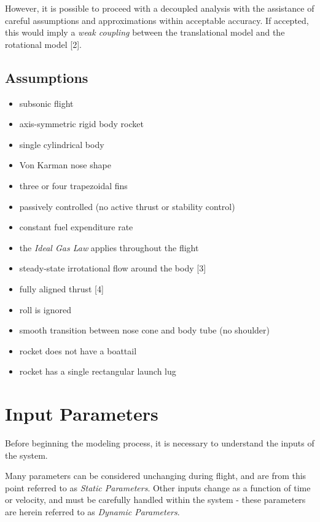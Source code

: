 \documentclass[]{article}
\providecommand{\tightlist}{%
  \setlength{\itemsep}{0pt}\setlength{\parskip}{0pt}}
\begin{document}
However, it is possible to proceed with a decoupled analysis with the
assistance of careful assumptions and approximations within acceptable
accuracy. If accepted, this would imply a \emph{weak coupling} between
the translational model and the rotational model {[}2{]}.

\subsection{Assumptions}\label{assumptions}

\begin{itemize}
\tightlist
\item
  subsonic flight
\item
  axis-symmetric rigid body rocket
\item
  single cylindrical body
\item
  Von Karman nose shape
\item
  three or four trapezoidal fins
\item
  passively controlled (no active thrust or stability control)
\item
  constant fuel expenditure rate
\item
  the \emph{Ideal Gas Law} applies throughout the flight
\item
  steady-state irrotational flow around the body {[}3{]}
\item
  fully aligned thrust {[}4{]}
\item
  roll is ignored
\item
  smooth transition between nose cone and body tube (no shoulder)
\item
  rocket does not have a boattail
\item
  rocket has a single rectangular launch lug
\end{itemize}

\section{Input Parameters}\label{input-parameters}

Before beginning the modeling process, it is necessary to understand the
inputs of the system.

Many parameters can be considered unchanging during flight, and are from
this point referred to as \emph{Static Parameters}. Other inputs change
as a function of time or velocity, and must be carefully handled within
the system - these parameters are herein referred to as \emph{Dynamic
Parameters}.
\end{document}
